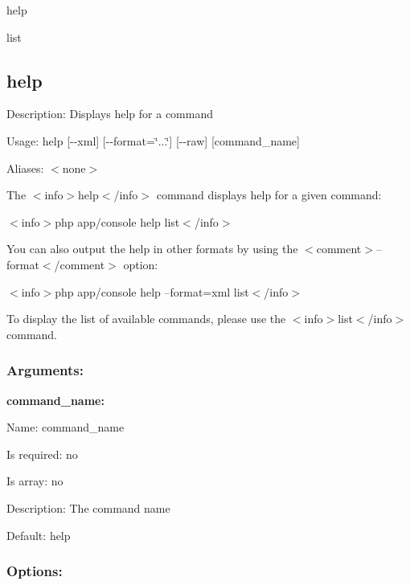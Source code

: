 
\begin{DoxyItemize}
\item help
\item list
\end{DoxyItemize}

\subsection*{help }


\begin{DoxyItemize}
\item Description\+: Displays help for a command
\item Usage\+: {\ttfamily help [-\/-\/xml] [-\/-\/format=\char`\"{}...\char`\"{}] [-\/-\/raw] [command\+\_\+name]}
\item Aliases\+: $<$none$>$
\end{DoxyItemize}

The $<$info$>$help$<$/info$>$ command displays help for a given command\+:

$<$info$>$php app/console help list$<$/info$>$

You can also output the help in other formats by using the $<$comment$>$--format$<$/comment$>$ option\+:

$<$info$>$php app/console help --format=xml list$<$/info$>$

To display the list of available commands, please use the $<$info$>$list$<$/info$>$ command.

\subsubsection*{Arguments\+:}

{\bfseries command\+\_\+name\+:}


\begin{DoxyItemize}
\item Name\+: command\+\_\+name
\item Is required\+: no
\item Is array\+: no
\item Description\+: The command name
\item Default\+: {\ttfamily \textquotesingle{}help\textquotesingle{}}
\end{DoxyItemize}

\subsubsection*{Options\+:}

